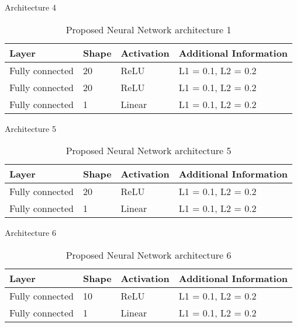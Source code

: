 Architecture 4

\begin{table}[!htb]
\centering
\begin{tabular}{l l l l}
	\hline
	Layer & Shape & Activation & Additional Information\\
  	\hline
  	Fully connected & 20 & ReLU & L1 = 0.1, L2 = 0.2\\
  	Fully connected & 20 & ReLU & L1 = 0.1, L2 = 0.2\\
  	Fully connected & 1 & Linear & L1 = 0.1, L2 = 0.2\\
  	\hline
\end{tabular}
\caption{Proposed Neural Network architecture 1}
\label{table:proposed_nn_1}
\end{table}

Architecture 5

\begin{table}[!htb]
\centering
\begin{tabular}{l l l l}
	\hline
	Layer & Shape & Activation & Additional Information\\
  	\hline
  	Fully connected & 20 & ReLU & L1 = 0.1, L2 = 0.2\\
  	Fully connected & 1 & Linear & L1 = 0.1, L2 = 0.2\\
  	\hline
\end{tabular}
\caption{Proposed Neural Network architecture 5}
\label{table:proposed_nn_5}
\end{table}

\pagebreak

Architecture 6

\begin{table}[!htb]
\centering
\begin{tabular}{l l l l}
	\hline
	Layer & Shape & Activation & Additional Information\\
  	\hline
  	Fully connected & 10 & ReLU & L1 = 0.1, L2 = 0.2\\
  	Fully connected & 1 & Linear & L1 = 0.1, L2 = 0.2\\
  	\hline
\end{tabular}
\caption{Proposed Neural Network architecture 6}
\label{table:proposed_nn_6}
\end{table}